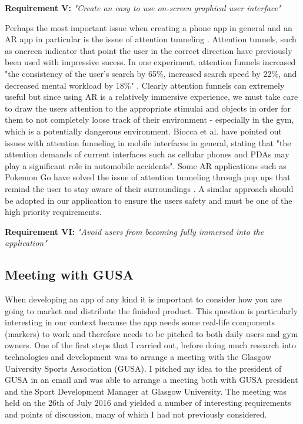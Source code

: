 \documentclass{l4proj}
\begin{document}
\textbf{Requirement V:} \textit{"Create an easy to use on-screen graphical user interface"}  


Perhaps the most important issue when creating a phone app in general and an AR app in particular is the issue of attention tunneling \cite{radu_why_2012} \cite{biocca_attention_2007}. Attention tunnels, such as oncreen indicator that point the user in the correct direction have previously been used with impressive sucess\cite{biocca_attention_2007}. In one experiment, attention funnels increased "the consistency of the user’s search by 65\%,  increased search speed by 22\%, and decreased mental workload by 18\%" \cite{biocca_attention_2007}. Clearly attention funnels can extremely useful but since using AR is a relatively immersive experience, we must take care to draw the users attention to the appropriate stimulai and objects in order for them to not completely loose track of their environment - especially in the gym, which is a potentially dangerous environment. Biocca et al. have pointed out issues with attention funneling in mobile interfaces in general, stating that "the attention demands of current interfaces such as cellular phones and PDAs may play a significant role in automobile accidents". Some AR applications such as Pokemon Go have solved the issue of attention tunneling through pop ups that remind the user to stay aware of their surroundings \cite{hollister_drivers_2016}. A similar approach should be adopted in our application to ensure the users safety and must be one of the high priority requirements.

\textbf{Requirement VI:} \textit{"Avoid users from becoming fully immersed into the application"} 


\subsection{Meeting with GUSA}
When developing an app of any kind it is important to consider how you are going to market and distribute the finished product. This question is particularly interesting in our context because the app needs some real-life components (markers) to work and therefore needs to be pitched to both daily users and gym owners. One of the first steps that I carried out, before doing much research into technologies and development was to arrange a meeting with the Glasgow University Sports Association (GUSA). I pitched my idea to the president of GUSA in an email and was able to arrange a meeting both with GUSA president and the Sport Development Manager at Glasgow University. The meeting 	was held on the 26th of July 2016 and yielded a number of interesting requirements and points of discussion, many of which I had not previously considered. 
\end{document}
